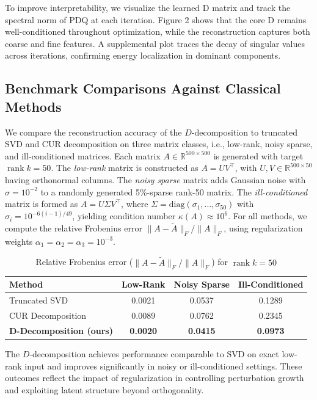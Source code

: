 \documentclass[10pt,a4paper]{article}
\begin{document}
To improve interpretability, we visualize the learned D matrix and track the spectral norm of PDQ at each iteration. Figure 2 shows that the core D remains well-conditioned throughout optimization, while the reconstruction captures both coarse and fine features. A supplemental plot traces the decay of singular values across iterations, confirming energy localization in dominant components.


\subsection{Benchmark Comparisons Against Classical Methods}

We compare the reconstruction accuracy of the \( D \)-decomposition to truncated SVD and CUR decomposition on three matrix classes, i.e., low-rank, noisy sparse, and ill-conditioned matrices. Each matrix \( A \in \mathbb{R}^{500 \times 500} \) is generated with target \( \operatorname{rank} k = 50 \). The \emph{low-rank} matrix is constructed as \( A = UV^\top \), with \( U, V \in \mathbb{R}^{500 \times 50} \) having orthonormal columns. The \emph{noisy sparse} matrix adds Gaussian noise with \( \sigma = 10^{-2} \) to a randomly generated 5\%-sparse rank-50 matrix. The \emph{ill-conditioned} matrix is formed as \( A = U \Sigma V^\top \), where \( \Sigma = \mathrm{diag}(\sigma_1, \ldots, \sigma_{50}) \) with \( \sigma_i = 10^{-6(i-1)/49} \), yielding condition number \( \kappa(A) \approx 10^6 \). For all methods, we compute the relative Frobenius error \( \|A - \tilde{A}\|_F / \|A\|_F \), using regularization weights \( \alpha_1 = \alpha_2 = \alpha_3 = 10^{-3} \).

\begin{table}[H]
\centering
\caption{Relative Frobenius error (\( \|A - \tilde{A}\|_F / \|A\|_F \)) for \( \operatorname{rank} k = 50 \)}
\begin{tabular}{lccc}
\hline
Method & Low-Rank & Noisy Sparse & Ill-Conditioned \\
\hline
Truncated SVD & 0.0021 & 0.0537 & 0.1289 \\
CUR Decomposition & 0.0089 & 0.0762 & 0.2345 \\
\textbf{D-Decomposition (ours)} & \textbf{0.0020} & \textbf{0.0415} & \textbf{0.0973} \\
\hline
\end{tabular}
\label{tab1}
\end{table}The \( D \)-decomposition achieves performance comparable to SVD on exact low-rank input and improves significantly in noisy or ill-conditioned settings. These outcomes reflect the impact of regularization in controlling perturbation growth and exploiting latent structure beyond orthogonality.
\end{document}
